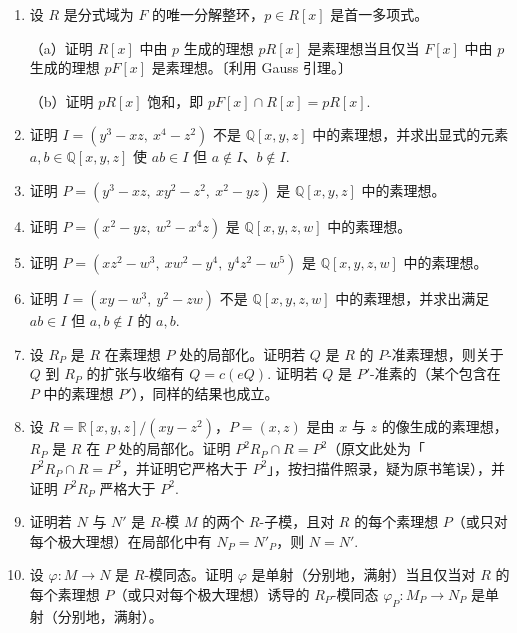 \begin{enumerate}
\item 设 \(R\) 是分式域为 \(F\) 的唯一分解整环，\(p \in R[x]\) 是首一多项式。

（a）证明 \(R[x]\) 中由 \(p\) 生成的理想 \(pR[x]\) 是素理想当且仅当 \(F[x]\) 中由 \(p\) 生成的理想 \(pF[x]\) 是素理想。〔利用 Gauss 引理。〕

（b）证明 \(pR[x]\) 饱和，即 \(pF[x] \cap R[x] = pR[x]\).

\item 证明 \(I = (y^3-xz,\ x^4-z^2)\) 不是 \(\mathbb{Q}[x,y,z]\) 中的素理想，并求出显式的元素 \(a, b \in \mathbb{Q}[x,y,z]\) 使 \(ab \in I\) 但 \(a \notin I\)、\(b \notin I\).

\item 证明 \(P = (y^3-xz,\ xy^2-z^2,\ x^2-yz)\) 是 \(\mathbb{Q}[x,y,z]\) 中的素理想。

\item 证明 \(P = (x^2-yz,\ w^2-x^4z)\) 是 \(\mathbb{Q}[x,y,z,w]\) 中的素理想。

\item 证明 \(P = (xz^2-w^3,\ xw^2-y^4,\ y^4z^2-w^5)\) 是 \(\mathbb{Q}[x,y,z,w]\) 中的素理想。

\item 证明 \(I = (xy-w^3,\ y^2-zw)\) 不是 \(\mathbb{Q}[x,y,z,w]\) 中的素理想，并求出满足 \(ab \in I\) 但 \(a, b \notin I\) 的 \(a, b\).

\item 设 \(R_P\) 是 \(R\) 在素理想 \(P\) 处的局部化。证明若 \(Q\) 是 \(R\) 的 \(P\)-准素理想，则关于 \(Q\) 到 \(R_P\) 的扩张与收缩有 \(Q = c(eQ)\). 证明若 \(Q\) 是 \(P'\)-准素的（某个包含在 \(P\) 中的素理想 \(P'\)），同样的结果也成立。

\item 设 \(R = \mathbb{R}[x,y,z]/(xy-z^2)\)，\(P = (x, z)\) 是由 \(x\) 与 \(z\) 的像生成的素理想，\(R_P\) 是 \(R\) 在 \(P\) 处的局部化。证明 \(P^2R_P \cap R = P^2\)（原文此处为「\(P^2R_P \cap R = P^2\)，并证明它严格大于 \(P^2\)」，按扫描件照录，疑为原书笔误），并证明 \(P^2R_P\) 严格大于 \(P^2\).

\item 证明若 \(N\) 与 \(N'\) 是 \(R\)-模 \(M\) 的两个 \(R\)-子模，且对 \(R\) 的每个素理想 \(P\)（或只对每个极大理想）在局部化中有 \(N_P = N'_P\)，则 \(N = N'\).

\item 设 \(\varphi : M \to N\) 是 \(R\)-模同态。证明 \(\varphi\) 是单射（分别地，满射）当且仅当对 \(R\) 的每个素理想 \(P\)（或只对每个极大理想）诱导的 \(R_P\)-模同态 \(\varphi_P : M_P \to N_P\) 是单射（分别地，满射）。


\end{enumerate}
